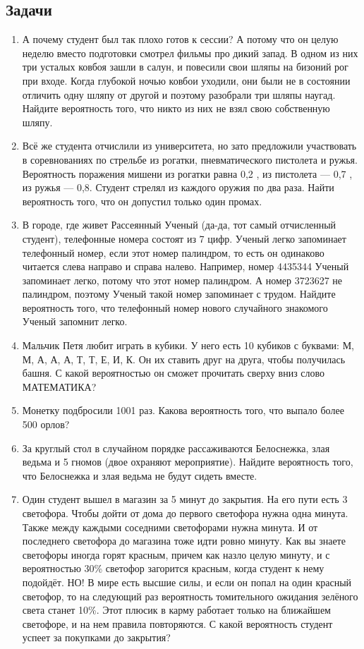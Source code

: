 \documentclass[a4paper,12pt]{article}
\begin{document}
    \subsection*{Задачи}
    \begin{enumerate}
        \item А почему студент был так плохо готов к сессии? А потому что он целую неделю вместо подготовки смотрел фильмы про дикий запад. В одном из них три усталых ковбоя зашли в салун, и повесили свои шляпы на бизоний рог при входе. Когда глубокой ночью ковбои уходили, они были не в состоянии отличить одну шляпу от другой и поэтому разобрали три шляпы наугад. Найдите вероятность того, что никто из них не взял свою собственную шляпу.
        \item Всё же студента отчислили из университета, но зато предложили участвовать в соревнованиях по стрельбе из рогатки, пневматического пистолета и ружья. Вероятность поражения мишени из рогатки равна 0,2  , из пистолета — 0,7  , из ружья — 0,8. Студент стрелял из каждого оружия по два раза. Найти вероятность того, что он допустил только один промах.
        \item В городе, где живет Рассеянный Ученый (да-да, тот самый отчисленный студент), телефонные номера состоят из 7 цифр. Ученый легко запоминает телефонный номер, если этот номер палиндром, то есть он одинаково читается слева направо и справа налево. Например, номер 4435344 Ученый запоминает легко, потому что этот номер палиндром. А номер 3723627 не палиндром, поэтому Ученый такой номер запоминает с трудом. Найдите вероятность того, что телефонный номер нового случайного знакомого Ученый запомнит легко.
        \item Мальчик Петя любит играть в кубики. У него есть 10 кубиков с буквами: М, М, А, А, А, Т, Т, Е, И, К. Он их ставить друг на друга, чтобы получилась башня. С какой вероятностью он сможет прочитать сверху вниз слово МАТЕМАТИКА?
        \item Монетку подбросили 1001 раз. Какова вероятность того, что выпало более 500 орлов?
        \item За круглый стол в случайном порядке рассаживаются Белоснежка, злая ведьма и 5 гномов (двое охраняют мероприятие). Найдите вероятность того, что Белоснежка и злая ведьма не будут сидеть вместе.
        \item Один студент вышел в магазин за 5 минут до закрытия. На его пути есть 3 светофора. Чтобы дойти от дома до первого светофора нужна одна минута. Также между каждыми соседними светофорами нужна минута. И от последнего светофора до магазина тоже идти ровно минуту. Как вы знаете светофоры иногда горят красным, причем как назло целую минуту, и с вероятностью 30\% светофор загорится красным, когда студент к нему подойдёт. НО! В мире есть высшие силы, и если он попал на один красный светофор, то на следующий раз вероятность томительного ожидания зелёного света станет 10\%. Этот плюсик в карму работает только на ближайшем светофоре, и на нем правила повторяются. С какой вероятность студент успеет за покупками до закрытия?
    \end{enumerate}
    
\end{document}
